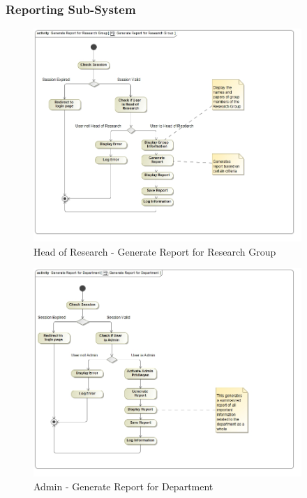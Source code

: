 \documentclass{article}
\begin{document}
			\subsubsection{Reporting Sub-System}
			\begin{figure}[H]
				\includegraphics[width=4in, center]{../Diagrams/Process Specifications/act__Generate_Report_for_Research_Group__Generate_Report_for_Research_Group.jpg}
				\caption{Head of Research - Generate Report for Research Group}
			\end{figure}
			\begin{figure}[H]
				\includegraphics[width=4in, center]{../Diagrams/Process Specifications/act__Generate_Report_for_Department__Generate_Report_for_Department.jpg}
				\caption{Admin - Generate Report for Department}
			\end{figure}
\end{document}
